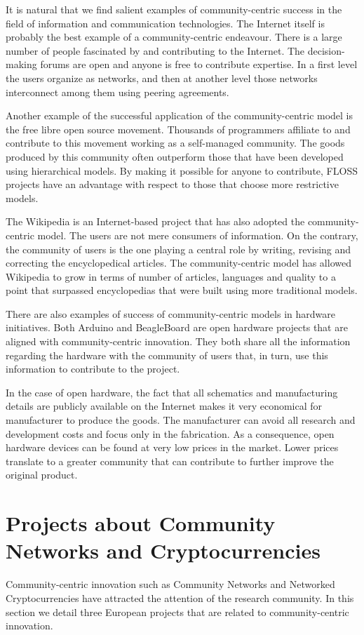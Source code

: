 \documentclass[journal]{IEEEtran}
\begin{document}
It is natural that we find salient examples of community-centric success in the field of information and communication technologies.
The Internet itself is probably the best example of a community-centric endeavour.
There is a large number of people fascinated by and contributing to the Internet.
The decision-making forums are open and anyone is free to contribute expertise.
In a first level the users organize as networks, and then at another level those networks interconnect among them using peering agreements.

Another example of the successful application of the community-centric model is the free libre open source movement.
Thousands of programmers affiliate to and contribute to this movement working as a self-managed community.
The goods produced by this community often outperform those that have been developed using hierarchical models.
By making it possible for anyone to contribute, FLOSS projects have an advantage with respect to those that choose more restrictive models.

The Wikipedia is an Internet-based project that has also adopted the community-centric model.
The users are not mere consumers of information. 
On the contrary, the community of users is the one playing a central role by writing, revising and correcting the encyclopedical articles.
The community-centric model has allowed Wikipedia to grow in terms of number of articles, languages and quality to a point that surpassed encyclopedias that were built using more traditional models.

There are also examples of success of community-centric models in hardware initiatives.
Both Arduino and BeagleBoard are open hardware projects that are aligned with community-centric innovation.
They both share all the information regarding the hardware with the community of users that, in turn, use this information to contribute to the project.

In the case of open hardware, the fact that all schematics and manufacturing details are publicly available on the Internet makes it very economical for manufacturer to produce the goods.
The manufacturer can avoid all research and development costs and focus only in the fabrication.
As a consequence, open hardware devices can be found at very low prices in the market.
Lower prices translate to a greater community that can contribute to further improve the original product.

\section{Projects about Community Networks and Cryptocurrencies}
Community-centric innovation such as Community Networks and Networked Cryptocurrencies have attracted the attention of the research community.
In this section we detail three European projects that are related to community-centric innovation.
\end{document}
